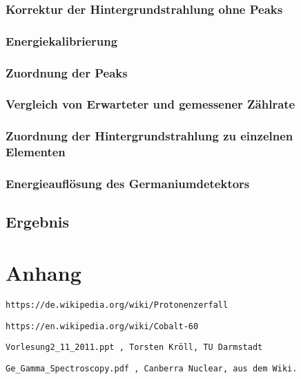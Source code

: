 \documentclass[]{article}
\begin{document}
\subsubsection{Korrektur der Hintergrundstrahlung ohne Peaks}
\subsubsection{Energiekalibrierung}
\subsubsection{Zuordnung der Peaks}
\subsubsection{Vergleich von Erwarteter und gemessener Zählrate}
\subsubsection{Zuordnung der Hintergrundstrahlung zu einzelnen Elementen}
\subsubsection{Energieauflösung des Germaniumdetektors}

\subsection{Ergebnis}


\newpage
\section{Anhang}


\newpage
\begin{thebibliography}{}

 \begin{verbatim}
https://de.wikipedia.org/wiki/Protonenzerfall
\end{verbatim}

 \begin{verbatim}
https://en.wikipedia.org/wiki/Cobalt-60
\end{verbatim}

\begin{verbatim}
Vorlesung2_11_2011.ppt , Torsten Kröll, TU Darmstadt
\end{verbatim}  

\begin{verbatim}
Ge_Gamma_Spectroscopy.pdf , Canberra Nuclear, aus dem Wiki.
\end{verbatim}  

\end{thebibliography}
\end{document}
